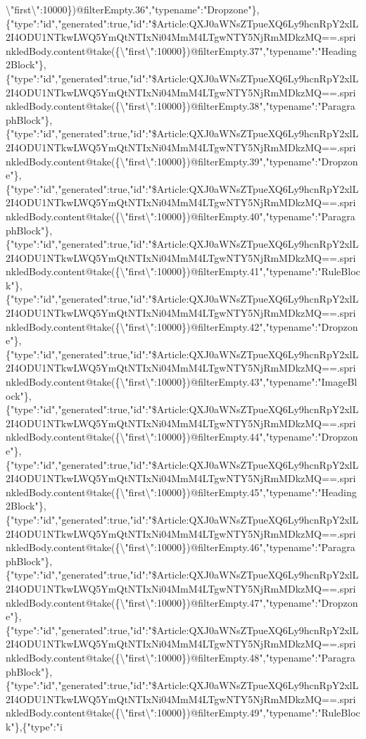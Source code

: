\textbackslash{}"first\textbackslash{}":10000\})@filterEmpty.36","typename":"Dropzone"\},\{"type":"id","generated":true,"id":"\$Article:QXJ0aWNsZTpueXQ6Ly9hcnRpY2xlL2I4ODU1NTkwLWQ5YmQtNTIxNi04MmM4LTgwNTY5NjRmMDkzMQ==.sprinkledBody.content@take(\{\textbackslash{}"first\textbackslash{}":10000\})@filterEmpty.37","typename":"Heading2Block"\},\{"type":"id","generated":true,"id":"\$Article:QXJ0aWNsZTpueXQ6Ly9hcnRpY2xlL2I4ODU1NTkwLWQ5YmQtNTIxNi04MmM4LTgwNTY5NjRmMDkzMQ==.sprinkledBody.content@take(\{\textbackslash{}"first\textbackslash{}":10000\})@filterEmpty.38","typename":"ParagraphBlock"\},\{"type":"id","generated":true,"id":"\$Article:QXJ0aWNsZTpueXQ6Ly9hcnRpY2xlL2I4ODU1NTkwLWQ5YmQtNTIxNi04MmM4LTgwNTY5NjRmMDkzMQ==.sprinkledBody.content@take(\{\textbackslash{}"first\textbackslash{}":10000\})@filterEmpty.39","typename":"Dropzone"\},\{"type":"id","generated":true,"id":"\$Article:QXJ0aWNsZTpueXQ6Ly9hcnRpY2xlL2I4ODU1NTkwLWQ5YmQtNTIxNi04MmM4LTgwNTY5NjRmMDkzMQ==.sprinkledBody.content@take(\{\textbackslash{}"first\textbackslash{}":10000\})@filterEmpty.40","typename":"ParagraphBlock"\},\{"type":"id","generated":true,"id":"\$Article:QXJ0aWNsZTpueXQ6Ly9hcnRpY2xlL2I4ODU1NTkwLWQ5YmQtNTIxNi04MmM4LTgwNTY5NjRmMDkzMQ==.sprinkledBody.content@take(\{\textbackslash{}"first\textbackslash{}":10000\})@filterEmpty.41","typename":"RuleBlock"\},\{"type":"id","generated":true,"id":"\$Article:QXJ0aWNsZTpueXQ6Ly9hcnRpY2xlL2I4ODU1NTkwLWQ5YmQtNTIxNi04MmM4LTgwNTY5NjRmMDkzMQ==.sprinkledBody.content@take(\{\textbackslash{}"first\textbackslash{}":10000\})@filterEmpty.42","typename":"Dropzone"\},\{"type":"id","generated":true,"id":"\$Article:QXJ0aWNsZTpueXQ6Ly9hcnRpY2xlL2I4ODU1NTkwLWQ5YmQtNTIxNi04MmM4LTgwNTY5NjRmMDkzMQ==.sprinkledBody.content@take(\{\textbackslash{}"first\textbackslash{}":10000\})@filterEmpty.43","typename":"ImageBlock"\},\{"type":"id","generated":true,"id":"\$Article:QXJ0aWNsZTpueXQ6Ly9hcnRpY2xlL2I4ODU1NTkwLWQ5YmQtNTIxNi04MmM4LTgwNTY5NjRmMDkzMQ==.sprinkledBody.content@take(\{\textbackslash{}"first\textbackslash{}":10000\})@filterEmpty.44","typename":"Dropzone"\},\{"type":"id","generated":true,"id":"\$Article:QXJ0aWNsZTpueXQ6Ly9hcnRpY2xlL2I4ODU1NTkwLWQ5YmQtNTIxNi04MmM4LTgwNTY5NjRmMDkzMQ==.sprinkledBody.content@take(\{\textbackslash{}"first\textbackslash{}":10000\})@filterEmpty.45","typename":"Heading2Block"\},\{"type":"id","generated":true,"id":"\$Article:QXJ0aWNsZTpueXQ6Ly9hcnRpY2xlL2I4ODU1NTkwLWQ5YmQtNTIxNi04MmM4LTgwNTY5NjRmMDkzMQ==.sprinkledBody.content@take(\{\textbackslash{}"first\textbackslash{}":10000\})@filterEmpty.46","typename":"ParagraphBlock"\},\{"type":"id","generated":true,"id":"\$Article:QXJ0aWNsZTpueXQ6Ly9hcnRpY2xlL2I4ODU1NTkwLWQ5YmQtNTIxNi04MmM4LTgwNTY5NjRmMDkzMQ==.sprinkledBody.content@take(\{\textbackslash{}"first\textbackslash{}":10000\})@filterEmpty.47","typename":"Dropzone"\},\{"type":"id","generated":true,"id":"\$Article:QXJ0aWNsZTpueXQ6Ly9hcnRpY2xlL2I4ODU1NTkwLWQ5YmQtNTIxNi04MmM4LTgwNTY5NjRmMDkzMQ==.sprinkledBody.content@take(\{\textbackslash{}"first\textbackslash{}":10000\})@filterEmpty.48","typename":"ParagraphBlock"\},\{"type":"id","generated":true,"id":"\$Article:QXJ0aWNsZTpueXQ6Ly9hcnRpY2xlL2I4ODU1NTkwLWQ5YmQtNTIxNi04MmM4LTgwNTY5NjRmMDkzMQ==.sprinkledBody.content@take(\{\textbackslash{}"first\textbackslash{}":10000\})@filterEmpty.49","typename":"RuleBlock"\},\{"type":"i